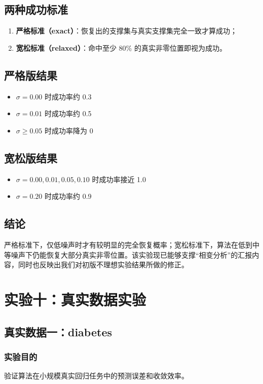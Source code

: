 \documentclass[12pt,a4paper]{ctexart}
\begin{document}
\subsection{两种成功标准}
\begin{enumerate}[label=\arabic*.]
    \item \textbf{严格标准（exact）}：恢复出的支撑集与真实支撑集完全一致才算成功；
    \item \textbf{宽松标准（relaxed）}：命中至少 80\% 的真实非零位置即视为成功。
\end{enumerate}

\subsection{严格版结果}
\begin{itemize}[leftmargin=2em]
    \item $\sigma=0.00$ 时成功率约 0.3
    \item $\sigma=0.01$ 时成功率约 0.5
    \item $\sigma \ge 0.05$ 时成功率降为 0
\end{itemize}

\subsection{宽松版结果}
\begin{itemize}[leftmargin=2em]
    \item $\sigma=0.00, 0.01, 0.05, 0.10$ 时成功率接近 1.0
    \item $\sigma=0.20$ 时成功率约 0.9
\end{itemize}

\subsection{结论}
严格标准下，仅低噪声时才有较明显的完全恢复概率；宽松标准下，算法在低到中等噪声下仍能恢复大部分真实非零位置。该实验现已能够支撑“相变分析”的汇报内容，同时也反映出我们对初版不理想实验结果所做的修正。

\section{实验十：真实数据实验}
\subsection{真实数据一：diabetes}
\subsubsection{实验目的}
验证算法在小规模真实回归任务中的预测误差和收敛效率。
\end{document}
